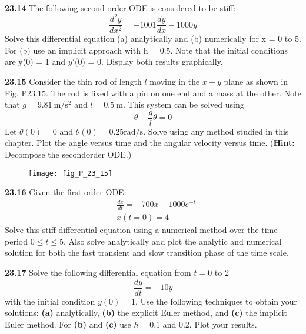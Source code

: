 \documentclass[../main.tex]{subfiles}
\begin{document}
\noindent\textbf{23.14} The following second-order ODE is considered to be stiff:
$$
\frac{d^{2} y}{d x^{2}}=-1001 \frac{d y}{d x}-1000 y
$$
Solve this differential equation (a) analytically and 
(b) numerically for x = 0 to 5. For (b) use an implicit
approach with h = 0.5. Note that the initial conditions are
y(0) = 1 and $y'$(0) = 0. Display both results graphically.\vspace{2mm}

\noindent\textbf{23.15} Consider the thin rod of length $l$ moving in the $x-y$ plane as shown in Fig. P23.15. The rod is fixed with a pin on one end and a mass at the other. Note that $g=9.81 \mathrm{~m} / \mathrm{s}^{2}$ and $l=0.5 \mathrm{~m}$. This system can be solved using
$$
\ddot{\theta}-\frac{g}{l} \theta=0
$$
Let $\theta(0)=0$ and $\dot{\theta}(0)=0.25 \mathrm{rad} / \mathrm{s}$. Solve using any method studied in this chapter. Plot the angle versus time and the angular velocity versus time. (\textbf{Hint:} Decompose the secondorder ODE.)

\begin{figure}[H]
    \centering
    \texttt{[image: fig\_P\_23\_15]}
    \label{fig:fig_P_23_15}
\end{figure}\vspace{2mm}

\noindent\textbf{23.16} Given the first-order ODE:
$$
\begin{aligned}
&\frac{d x}{d t}=-700 x-1000 e^{-t} \\
&x(t=0)=4
\end{aligned}
$$
Solve this stiff differential equation using a numerical method over the time period $0 \leq t \leq 5$. Also solve analytically and plot the analytic and numerical solution for both the fast transient and slow transition phase of the time scale.\vspace{2mm}

\noindent\textbf{23.17} Solve the following differential equation from $t=0$ to 2
$$
\frac{d y}{d t}=-10 y
$$
with the initial condition $y(0)=1$. Use the following techniques to obtain your solutions: \textbf{(a)} analytically, \textbf{(b)} the explicit Euler method, and \textbf{(c)} the implicit Euler method. For \textbf{(b)} and \textbf{(c)} use $h=0.1$ and 0.2. Plot your results.\vspace{2mm}
\end{document}
